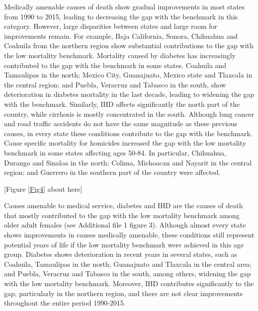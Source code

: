 \documentclass{bmcart}
\begin{document}
Medically amenable causes of death show gradual improvements in most states from 1990 to 2015, leading to decreasing the gap with the benchmark in this category. However, large disparities between states and large room for improvements remain. For example, Baja California, Sonora, Chihuahua and Coahuila from the northern region show substantial contributions to the gap with the low mortality benchmark. Mortality caused by diabetes has increasingly contributed to the gap with the benchmark in some states. Coahuila and Tamaulipas in the north; Mexico City, Guanajuato, Mexico state and Tlaxcala in the central region; and Puebla, Veracruz and Tabasco in the south, show deterioration in diabetes mortality in the last decade, leading to widening the gap with the benchmark. Similarly, IHD affects significantly the north part of the country, while cirrhosis is mostly concentrated in the south. Although lung cancer and road traffic accidents do not have the same magnitude as these previous causes, in every state these conditions contribute to the gap with the benchmark. Cause specific mortality for homicides increased the gap with the low mortality benchmark in some states affecting ages 50-84. In particular, Chihuahua, Durango and Sinaloa in the north; Colima, Michoacan and Nayarit in the central region; and Guerrero in the southern part of the country were affected.

\begin{center}
[Figure \ref{Fig4} about here]
\end{center}

Causes amenable to medical service, diabetes and IHD are the causes of death that mostly contributed to the gap with the low mortality benchmark among older adult females (see Additional file 1 figure 3). Although almost every state shows improvements in causes medically amenable, these conditions still represent potential years of life if the low mortality benchmark were achieved in this age group. Diabetes shows deterioration in recent years in several states, such as Coahuila, Tamaulipas in the north; Guanajuato and Tlaxcala in the central area; and Puebla, Veracruz and Tabasco in the south, among others, widening the gap with the low mortality benchmark. Moreover, IHD contributes significantly to the gap, particularly in the northern region, and there are not clear improvements throughout the entire period 1990-2015.
\end{document}
